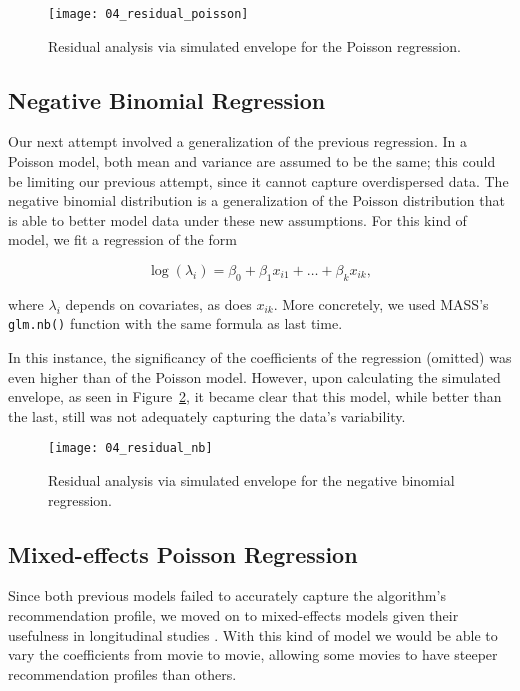 \begin{figure}
  \centering
  \texttt{[image: 04\_residual\_poisson]}
  \caption{Residual analysis via simulated envelope for the Poisson regression.\label{fig:fig04_residual_poisson}}
\end{figure}

\subsection{Negative Binomial Regression}
\label{subsec:negbin04}

Our next attempt involved a generalization of the previous regression. In a
Poisson model, both mean and variance are assumed to be the same; this could be
limiting our previous attempt, since it cannot capture overdispersed data. The
negative binomial distribution is a generalization of the Poisson distribution
\citep{allison_fixed-effects_2002} that is able to better model data under these
new assumptions. For this kind of model, we fit a regression of the form

$$
\log(\lambda_i) = \beta_0 + \beta_1 x_{i1} + \dots + \beta_k x_{ik},
$$

\noindent where $\lambda_i$ depends on covariates, as does $x_{ik}$. More
concretely, we used MASS's \citep{venables_modern_2002} \verb|glm.nb()| function
with the same formula as last time.

In this instance, the significancy of the coefficients of the regression
(omitted) was even higher than of the Poisson model. However, upon calculating
the simulated envelope, as seen in Figure~\ref{fig:fig04_residual_nb}, it became
clear that  this model, while better than the last, still was not adequately
capturing the data's variability.

\begin{figure}
  \centering
  \texttt{[image: 04\_residual\_nb]}
  \caption{Residual analysis via simulated envelope for the negative binomial regression.\label{fig:fig04_residual_nb}}
\end{figure}

\subsection{Mixed-effects Poisson Regression}
\label{subsec:mmpoisson04}

Since both previous models failed to accurately capture the algorithm's
recommendation profile, we moved on to mixed-effects models given their
usefulness in longitudinal studies \citep{gomes_should_2022}. With this kind of
model we would be able to vary the coefficients from movie to movie, allowing
some movies to have steeper recommendation profiles than others.

